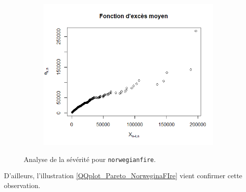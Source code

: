 \begin{figure}[H]
\begin{subfigure}[b]{0.3\textwidth}
					\includegraphics[scale=0.35]{Graphiques/Graph_Norwegianfire_MeanExcess} 
					\caption{} \label{Graph_Norwegianfire_MeanExcess}
				\end{subfigure}
				\renewcommand{\figurename}{Illustration}
				\caption{Analyse de la sévérité pour \texttt{norwegianfire}.} \label{Graph_Sev_NorvFire2}
			\end{figure}
			
			D'ailleurs, l'illustration \ref{QQplot_Pareto_NorweginaFIre} vient confirmer cette observation.
			
